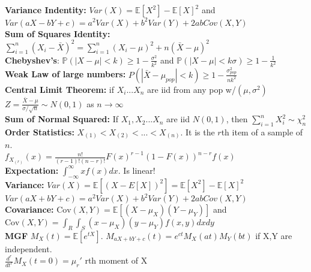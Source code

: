 \documentclass[answers,12pt,addpoints]{exam}
\begin{document}
\textbf{Variance Indentity:} $Var(X) = \mathbb{E}[X^2] - \mathbb{E}[X]^2$ and $Var(aX-bY+c) = a^2Var(X) + b^2Var(Y) + 2abCov(X,Y)$\\
\textbf{Sum of Squares Identity:} $\sum_{i=1}^n (X_i - \bar{X})^2 = \sum_{i=1}^n (X_i - \mu)^2 + n(\bar{X} - \mu)^2$\\
\textbf{Chebyshev's}: $\mathbb{P}(|X-\mu|< k) \geq 1 - \frac{\sigma^2}{k^2}$ and $\mathbb{P}(|X-\mu|< k\sigma) \geq 1 - \frac{1}{k^2}$\\
\textbf{Weak Law of large numbers:} $P(|\bar{X} - \mu_{pop}| < k ) \geq 1 -\frac{\sigma^2_{pop}}{nk^2} $\\
\textbf{Central Limit Theorem:} if $X_i ... X_n$ are iid from any pop w/$(\mu, \sigma^2)$ $Z = \frac{\bar{X} - \mu}{\sigma/\sqrt{n}} \sim N(0,1)$ as $n \to \infty$\\
\textbf{Sum of Normal Squared:} If $X_1, X_2 ... X_n$ are iid $N(0,1)$, then $\sum_{i=1}^n X_i^2 \sim \chi^2_n$\\
\textbf{Order Statistics:} $X_{(1)} < X_{(2)} < ... < X_{(n)}$. It is the $r$th item of a sample of $n$. \\
$f_{X_{(r)}}(x) = \frac{n!}{(r-1)!(n-r)!}F(x)^{r-1}(1-F(x))^{n-r}f(x)$\\
\textbf{Expectation:} $\int_{-\infty}^\infty xf(x)dx$. Is linear!\\
\textbf{Variance:} $Var(X) = \mathbb{E}[(X-E[X])^2] = \mathbb{E}[X^2] - \mathbb{E}[X]^2$\\
$Var(aX+bY+c) = a^2Var(X) + b^2Var(Y) + 2abCov(X,Y)$\\
\textbf{Covariance:} $\text{Cov}(X,Y) = \mathbb{E}[(X-\mu_X)(Y-\mu_Y)]$ and $\text{Cov}(X,Y) = \int_R \int_S (x-\mu_X)(y-\mu_Y)f(x,y)dxdy$\\
\textbf{MGF} $M_X(t) = \mathbb{E}[e^{tX}]$. $M_{aX+bY+c}(t) = e^{ct}M_X(at)M_Y(bt)$ if X,Y are independent. \\
$\frac{d^r}{dt^r} M_X(t = 0) = \mu_r' $ rth moment of X\\ 
\end{document}
